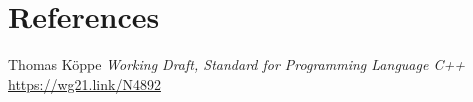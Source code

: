 \documentclass{wg21}
\begin{document}
\section{References}

\renewcommand{\section}[2]{}%



\begin{thebibliography}{9}

Thomas Köppe
\emph{Working Draft, Standard for Programming Language C++}\newline
\url{https://wg21.link/N4892}


\end{thebibliography}
\end{document}
